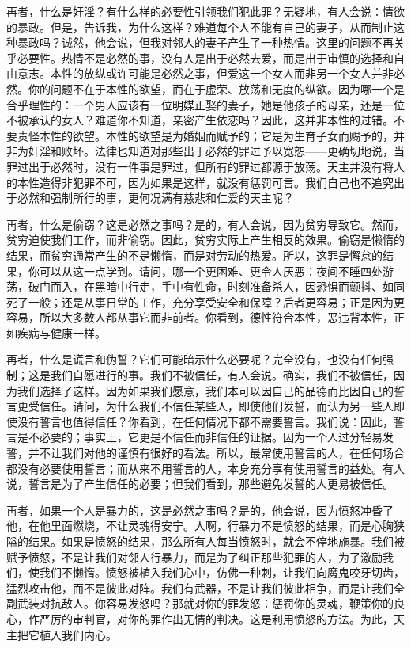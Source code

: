 再者，什么是奸淫？有什么样的必要性引领我们犯此罪？无疑地，有人会说：情欲的暴政。但是，告诉我，为什么这样？难道每个人不能有自己的妻子，从而制止这种暴政吗？诚然，他会说，但我对邻人的妻子产生了一种热情。这里的问题不再关乎必要性。热情不是必然的事，没有人是出于必然去爱，而是出于审慎的选择和自由意志。本性的放纵或许可能是必然之事，但爱这一个女人而非另一个女人并非必然。你的问题不在于本性的欲望，而在于虚荣、放荡和无度的纵欲。因为哪一个是合乎理性的：一个男人应该有一位明媒正娶的妻子，她是他孩子的母亲，还是一位不被承认的女人？难道你不知道，亲密产生依恋吗？因此，这并非本性的过错。不要责怪本性的欲望。本性的欲望是为婚姻而赋予的；它是为生育子女而赐予的，并非为奸淫和败坏。法律也知道对那些出于必然的罪过予以宽恕——更确切地说，当罪过出于必然时，没有一件事是罪过，但所有的罪过都源于放荡。天主并没有将人的本性造得非犯罪不可，因为如果是这样，就没有惩罚可言。我们自己也不追究出于必然和强制所行的事，更何况满有慈悲和仁爱的天主呢？\par

再者，什么是偷窃？这是必然之事吗？是的，有人会说，因为贫穷导致它。然而，贫穷迫使我们工作，而非偷窃。因此，贫穷实际上产生相反的效果。偷窃是懒惰的结果，而贫穷通常产生的不是懒惰，而是对劳动的热爱。所以，这罪是懈怠的结果，你可以从这一点学到。请问，哪一个更困难、更令人厌恶：夜间不睡四处游荡，破门而入，在黑暗中行走，手中有性命，时刻准备杀人，因恐惧而颤抖、如同死了一般；还是从事日常的工作，充分享受安全和保障？后者更容易；正是因为更容易，所以大多数人都从事它而非前者。你看到，德性符合本性，恶违背本性，正如疾病与健康一样。\par

再者，什么是谎言和伪誓？它们可能暗示什么必要呢？完全没有，也没有任何强制；这是我们自愿进行的事。我们不被信任，有人会说。确实，我们不被信任，因为我们选择了这样。因为如果我们愿意，我们本可以因自己的品德而比因自己的誓言更受信任。请问，为什么我们不信任某些人，即使他们发誓，而认为另一些人即使没有誓言也值得信任？你看到，在任何情况下都不需要誓言。我们说：因此，誓言是不必要的；事实上，它更是不信任而非信任的证据。因为一个人过分轻易发誓，并不让我们对他的谨慎有很好的看法。所以，最常使用誓言的人，在任何场合都没有必要使用誓言；而从来不用誓言的人，本身充分享有使用誓言的益处。有人说，誓言是为了产生信任的必要；但我们看到，那些避免发誓的人更易被信任。\par

再者，如果一个人是暴力的，这是必然之事吗？是的，他会说，因为愤怒冲昏了他，在他里面燃烧，不让灵魂得安宁。人啊，行暴力不是愤怒的结果，而是心胸狭隘的结果。如果是愤怒的结果，那么所有人每当愤怒时，就会不停地施暴。我们被赋予愤怒，不是让我们对邻人行暴力，而是为了纠正那些犯罪的人，为了激励我们，使我们不懒惰。愤怒被植入我们心中，仿佛一种刺，让我们向魔鬼咬牙切齿，猛烈攻击他，而不是彼此对阵。我们有武器，不是让我们彼此相争，而是让我们全副武装对抗敌人。你容易发怒吗？那就对你的罪发怒：惩罚你的灵魂，鞭策你的良心，作严厉的审判官，对你的罪作出无情的判决。这是利用愤怒的方法。为此，天主把它植入我们内心。\par

